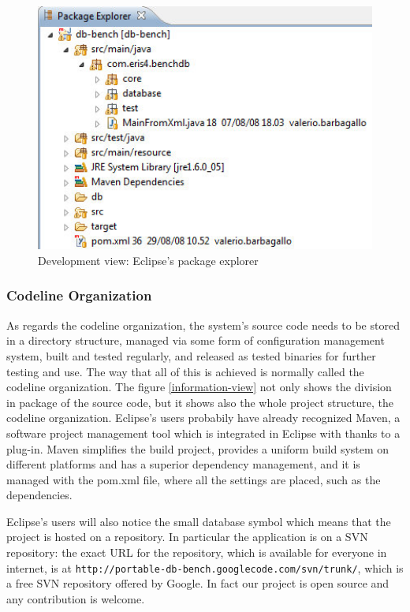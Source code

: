 \begin{figure}[htp!] 
	\begin{center}
		\includegraphics[width=13cm]{img/development-view.jpg}	
	\end{center}
	\caption{Development view: Eclipse's package explorer}
	\label{development-view}	
\end{figure}

			\subsubsection{Codeline Organization}

As regards the codeline organization, the system's source code needs to be stored in a directory structure, managed via some form of configuration management system, built and tested regularly, and released as tested binaries for further testing and use. The way that all of this is achieved is normally called the codeline organization. The figure \ref{information-view} not only shows the division in package of the source code, but it shows also the whole project structure, the codeline organization. Eclipse's users probabily have already recognized Maven, a software project management tool which is integrated in Eclipse with thanks to a plug-in. Maven simplifies the build project, provides a uniform build system on different platforms and has a superior dependency management, and it is managed with the pom.xml file, where all the settings are placed, such as the dependencies. 

Eclipse's users will also notice the small database symbol which means that the project is hosted on a repository. In particular the application is on a SVN repository: the exact URL for the repository, which is available for everyone in internet, is at \lstinline[commentstyle=\color{black}]!http://portable-db-bench.googlecode.com/svn/trunk/!, which is a free SVN repository offered by Google. In fact our project is open source and any contribution is welcome.

